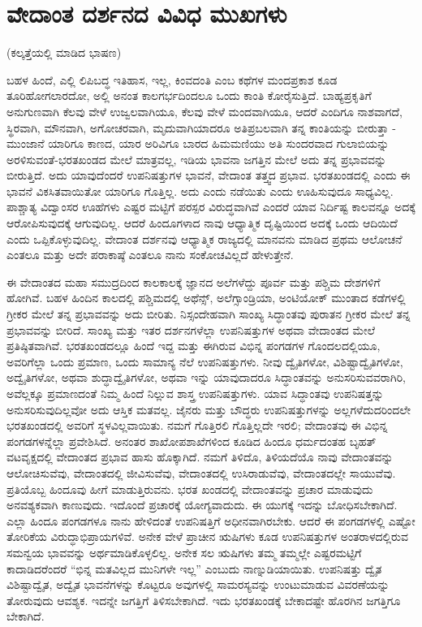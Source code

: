 
\chapter{ವೇದಾಂತ ದರ್ಶನದ ವಿವಿಧ ಮುಖಗಳು}

\begin{center}
(ಕಲ್ಕತ್ತೆಯಲ್ಲಿ ಮಾಡಿದ ಭಾಷಣ)
\end{center}

ಬಹಳ ಹಿಂದೆ, ಎಲ್ಲಿ ಲಿಪಿಬದ್ಧ ಇತಿಹಾಸ, ಇಲ್ಲ, ಕಿಂವದಂತಿ ಎಂಬ ಕಥೆಗಳ ಮಂದಪ್ರಕಾಶ ಕೂಡ ತೂರಿಹೋಗಲಾರದೋ, ಅಲ್ಲಿ ಅನಂತ ಕಾಲಗರ್ಭದಿಂದಲೂ ಒಂದು ಕಾಂತಿ ಕೋರೈಸುತ್ತಿದೆ. ಬಾಹ್ಯಪ್ರಕೃತಿಗೆ ಅನುಗುಣವಾಗಿ ಕೆಲವು ವೇಳೆ ಉಜ್ವಲವಾಗಿಯೂ, ಕೆಲವು ವೇಳೆ ಮಂದವಾಗಿಯೂ, ಆದರೆ ಎಂದಿಗೂ ನಾಶವಾಗದೆ, ಸ್ಥಿರವಾಗಿ, ಮೌನವಾಗಿ, ಅಗೋಚರವಾಗಿ, ಮೃದುವಾಗಿಯಾದರೂ ಅತಿಪ್ರಬಲವಾಗಿ ತನ್ನ ಕಾಂತಿಯನ್ನು ಬೀರುತ್ತಾ - ಮುಂಜಾನೆ ಯಾರಿಗೂ ಕಾಣದ, ಯಾರ ಅರಿವಿಗೂ ಬಾರದ ಹಿಮಮಣಿಯು ಅತಿ ಸುಂದರವಾದ ಗುಲಾಬಿಯನ್ನು ಅರಳಿಸುವಂತೆ-ಭರತಖಂಡದ ಮೇಲೆ ಮಾತ್ರವಲ್ಲ, ಇಡಿಯ ಭಾವನಾ ಜಗತ್ತಿನ ಮೇಲೆ ಅದು ತನ್ನ ಪ್ರಭಾವವನ್ನು ಬೀರುತ್ತಿದೆ. ಅದು ಯಾವುದೆಂದರೆ ಉಪನಿಷತ್ತುಗಳ ಭಾವನೆ, ವೇದಾಂತ ತತ್ತ್ವದ ಪ್ರಭಾವ. ಭರತಖಂಡದಲ್ಲಿ ಎಂದು ಈ ಭಾವನೆ ವಿಕಸಿತವಾಯಿತೋ ಯಾರಿಗೂ ಗೊತ್ತಿಲ್ಲ. ಅದು ಎಂದು ನಡೆಯಿತು ಎಂದು ಊಹಿಸುವುದೂ ಸಾಧ್ಯವಿಲ್ಲ. ಪಾಶ್ಚಾತ್ಯ ವಿದ್ವಾಂಸರ ಊಹೆಗಳು ಎಷ್ಟರ ಮಟ್ಟಿಗೆ ಪರಸ್ಪರ ವಿರುದ್ಧವಾಗಿವೆ ಎಂದರೆ ಯಾವ ನಿರ್ದಿಷ್ಟ ಕಾಲವನ್ನೂ ಅದಕ್ಕೆ ಆರೋಪಿಸುವುದಕ್ಕೆ ಆಗುವುದಿಲ್ಲ. ಆದರೆ ಹಿಂದೂಗಳಾದ ನಾವು ಆಧ್ಯಾತ್ಮಿಕ ದೃಷ್ಟಿಯಿಂದ ಅದಕ್ಕೆ ಒಂದು ಆದಿಯಿದೆ ಎಂದು ಒಪ್ಪಿಕೊಳ್ಳುವುದಿಲ್ಲ. ವೇದಾಂತ ದರ್ಶನವು ಆಧ್ಯಾತ್ಮಿಕ ರಾಜ್ಯದಲ್ಲಿ ಮಾನವನು ಮಾಡಿದ ಪ್ರಥಮ ಆಲೋಚನೆ ಎಂತಲೂ ಮತ್ತು ಅದೇ ಪರಾಕಾಷ್ಠೆ ಎಂತಲೂ ನಾನು ಸಂಕೋಚವಿಲ್ಲದೆ ಹೇಳುತ್ತೇನೆ.

ಈ ವೇದಾಂತದ ಮಹಾ ಸಮುದ್ರದಿಂದ ಕಾಲಕಾಲಕ್ಕೆ ಜ್ಞಾನದ ಅಲೆಗಳೆದ್ದು ಪೂರ್ವ ಮತ್ತು ಪಶ್ಚಿಮ ದೇಶಗಳಿಗೆ ಹೋಗಿವೆ. ಬಹಳ ಹಿಂದಿನ ಕಾಲದಲ್ಲಿ ಪಶ್ಚಿಮದಲ್ಲಿ ಅಥೆನ್ಸ್, ಅಲೆಗ್ಸಾಂಡ್ರಿಯಾ, ಅಂಟಿಯೋಕ್​ ಮುಂತಾದ ಕಡೆಗಳಲ್ಲಿ ಗ್ರೀಕರ ಮೇಲೆ ತನ್ನ ಪ್ರಭಾವವನ್ನು ಅದು ಬೀರಿತು. ನಿಸ್ಸಂದೇಹವಾಗಿ ಸಾಂಖ್ಯ ಸಿದ್ಧಾಂತವು ಪುರಾತನ ಗ್ರೀಕರ ಮೇಲೆ ತನ್ನ ಪ್ರಭಾವವನ್ನು ಬೀರಿದೆ. ಸಾಂಖ್ಯ ಮತ್ತು ಇತರ ದರ್ಶನಗಳೆಲ್ಲಾ ಉಪನಿಷತ್ತುಗಳ ಅಥವಾ ವೇದಾಂತದ ಮೇಲೆ ಪ್ರತಿಷ್ಠಿತವಾಗಿವೆ. ಭರತಖಂಡದಲ್ಲೂ ಹಿಂದೆ ಇದ್ದ ಮತ್ತು ಈಗಿರುವ ವಿಭಿನ್ನ ಪಂಗಡಗಳ ಗೊಂದಲದಲ್ಲಿಯೂ, ಅವರಿಗೆಲ್ಲಾ ಒಂದು ಪ್ರಮಾಣ, ಒಂದು ಸಾಮಾನ್ಯ ನೆಲೆ ಉಪನಿಷತ್ತುಗಳು. ನೀವು ದ್ವೈತಿಗಳೋ, ವಿಶಿಷ್ಟಾದ್ವೈತಿಗಳೋ, ಅದ್ವೈತಿಗಳೋ, ಅಥವಾ ಶುದ್ಧಾದ್ವೈತಿಗಳೋ, ಅಥವಾ ಇನ್ನು ಯಾವುದಾದರೂ ಸಿದ್ಧಾಂತವನ್ನು ಅನುಸರಿಸುವವರಾಗಿರಿ, ಅವೆಲ್ಲಕ್ಕೂ ಪ್ರಮಾಣದಂತೆ ನಿಮ್ಮ ಹಿಂದೆ ನಿಲ್ಲುವ ಶಾಸ್ತ್ರ ಉಪನಿಷತ್ತುಗಳು. ಯಾವ ಸಿದ್ಧಾಂತವು ಉಪನಿಷತ್ತನ್ನು ಅನುಸರಿಸುವುದಿಲ್ಲವೋ ಅದು ಆಸ್ತಿಕ ಮತವಲ್ಲ. ಜೈನರು ಮತ್ತು ಬೌದ್ಧರು ಉಪನಿಷತ್ತುಗಳನ್ನು ಅಲ್ಲಗಳೆದುದರಿಂದಲೇ ಭರತಖಂಡದಲ್ಲಿ ಅವರಿಗೆ ಸ್ಥಳವಿಲ್ಲವಾಯಿತು. ನಮಗೆ ಗೊತ್ತಿರಲಿ ಗೊತ್ತಿಲ್ಲದೇ ಇರಲಿ; ವೇದಾಂತವು ಈ ವಿಭಿನ್ನ ಪಂಗಡಗಳನ್ನೆಲ್ಲಾ ಪ್ರವೇಶಿಸಿದೆ. ಅನಂತರ ಶಾಖೋಪಶಾಖೆಗಳಿಂದ ಕೂಡಿದ ಹಿಂದೂ ಧರ್ಮದಂತಹ ಬೃಹತ್​ ವಟವೃಕ್ಷದಲ್ಲಿ ವೇದಾಂತದ ಪ್ರಭಾವ ಹಾಸು ಹೊಕ್ಕಾಗಿದೆ. ನಮಗೆ ತಿಳಿದೊ, ತಿಳಿಯದೆಯೊ ನಾವು ವೇದಾಂತವನ್ನು ಆಲೋಚಿಸುವೆವು, ವೇದಾಂತದಲ್ಲಿ ಜೀವಿಸುವೆವು, ವೇದಾಂತದಲ್ಲಿ ಉಸಿರಾಡುವೆವು, ವೇದಾಂತದಲ್ಲೇ ಸಾಯುವೆವು. ಪ್ರತಿಯೊಬ್ಬ ಹಿಂದೂವು ಹೀಗೆ ಮಾಡುತ್ತಿರುವನು. ಭರತ ಖಂಡದಲ್ಲಿ ವೇದಾಂತವನ್ನು ಪ್ರಚಾರ ಮಾಡುವುದು ಅನವಶ್ಯಕವಾಗಿ ಕಾಣುವುದು. ಇದೊಂದೆ ಪ್ರಚಾರಕ್ಕೆ ಯೋಗ್ಯವಾದುದು. ಈ ಯುಗಕ್ಕೆ ಇದನ್ನು ಬೋಧಿಸಬೇಕಾಗಿದೆ. ಎಲ್ಲಾ ಹಿಂದೂ ಪಂಗಡಗಳೂ ನಾನು ಹೇಳಿದಂತೆ ಉಪನಿಷತ್ತಿಗೆ ಅಧೀನವಾಗಿರಬೇಕು. ಆದರೆ ಈ ಪಂಗಡಗಳಲ್ಲಿ ಎಷ್ಟೋ ತೋರಿಕೆಯ ವಿರುದ್ಧಾಭಿಪ್ರಾಯಗಳಿವೆ. ಅನೇಕ ವೇಳೆ ಪ್ರಾಚೀನ ಋಷಿಗಳು ಕೂಡ ಉಪನಿಷತ್ತುಗಳ ಅಂತರಾಳದಲ್ಲಿರುವ ಸಮನ್ವಯ ಭಾವವನ್ನು ಅರ್ಥಮಾಡಿಕೊಳ್ಳಲಿಲ್ಲ. ಅನೇಕ ಸಲ ಋಷಿಗಳು ತಮ್ಮ ತಮ್ಮಲ್ಲೇ ಎಷ್ಟರಮಟ್ಟಿಗೆ ಕಾದಾಡಿದರೆಂದರೆ “ಭಿನ್ನ ಮತವಿಲ್ಲದ ಮುನಿಗಳೇ ಇಲ್ಲ” ಎಂಬುದು ನಾಣ್ನುಡಿಯಾಯಿತು. ಉಪನಿಷತ್ತು ದ್ವೈತ ವಿಶಿಷ್ಟಾದ್ವೈತ, ಅದ್ವೈತ ಭಾವನೆಗಳನ್ನು ಕೊಟ್ಟರೂ ಅವುಗಳಲ್ಲಿ ಸಾಮರಸ್ಯವನ್ನು ಉಂಟುಮಾಡುವ ವಿವರಣೆಯನ್ನು ತೋರುವುದು ಆವಶ್ಯಕ. ಇದನ್ನೇ ಜಗತ್ತಿಗೆ ತಿಳಿಸಬೇಕಾಗಿದೆ. ಇದು ಭರತಖಂಡಕ್ಕೆ ಬೇಕಾದಷ್ಟೇ ಹೊರಗಿನ ಜಗತ್ತಿಗೂ ಬೇಕಾಗಿದೆ.

